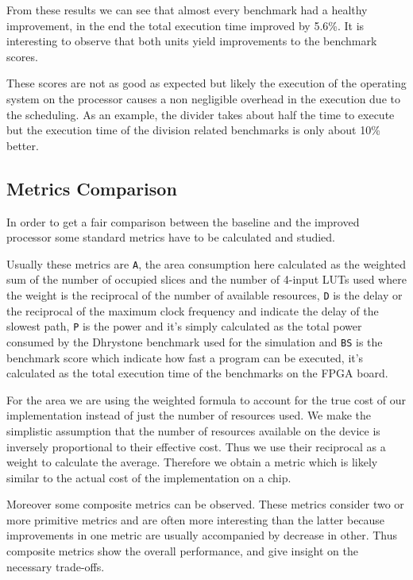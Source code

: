 From these results we can see that almost every benchmark had a healthy improvement, in the end
the total execution time improved by 5.6\%.
It is interesting to observe that both units yield improvements to the benchmark scores.

These scores are not as good as expected but likely the execution of the operating system
on the processor causes a non negligible overhead in the execution due to the scheduling. As an example, the
divider takes about half the time to execute but the execution time of the division related
benchmarks is only about 10\% better.

\subsection{Metrics Comparison}
\label{ssec:metrics}

In order to get a fair comparison between the baseline and the improved processor some standard
metrics have to be calculated and studied.

Usually these metrics are \texttt{A}, the area consumption here calculated as the weighted sum of the
number of occupied slices and the number of 4-input LUTs used where the weight is the reciprocal
of the number of available resources, \texttt{D} is the delay or the reciprocal of the maximum clock frequency
and indicate the delay of the slowest path, \texttt{P} is the power and it's simply calculated as the total
power consumed by the Dhrystone benchmark used for the simulation and \texttt{BS} is the benchmark
score which indicate how fast a program can be executed, it's calculated as the total execution
time of the benchmarks on the FPGA board.

For the area we are using the weighted formula to account for the true cost of our implementation instead of just the number of resources used.
We make the simplistic assumption that the number of resources available on the device is inversely proportional to their effective cost. Thus we use their reciprocal as a weight to calculate the average. Therefore we obtain a metric which is likely similar to the actual cost of the implementation on a chip.

Moreover some composite metrics can be observed. These metrics consider two or more primitive
metrics and are often more interesting than the latter because improvements in one metric are usually accompanied by decrease in other.
Thus composite metrics show the overall performance, and give insight on the necessary trade-offs.

